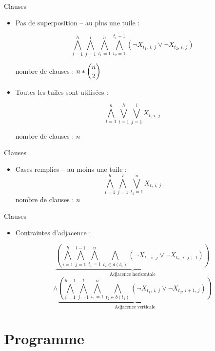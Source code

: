 \documentclass[aspectratio=43,11pt,hyperref={pdfpagemode=FullScreen}]{beamer}
\begin{document}
\begin{frame}{Clauses}
\begin{itemize}
\item Pas de superposition -- au plus une tuile :

$$ \bigwedge_{i = 1}^{h} \bigwedge_{j = 1}^{l} \bigwedge_{t_1 = 1}^{n} \bigwedge_{t_2 = 1}^{t_1-1} \left( \lnot X_{t_1, \, i, \, j} \lor \lnot X_{t_2, \, i, \, {j}} \right) $$

 nombre de clauses : $n*\dbinom{n}{2} $

\item Toutes les tuiles sont utilisées :

$$ \bigwedge_{t = 1}^{n} \bigvee_{i = 1}^{h} \bigvee_{j = 1}^{l}  X_{t, \, i, \, j} $$

 nombre de clauses : $n$ 
\end{itemize}

\end{frame}

\begin{frame}{Clauses}
    \begin{itemize}
         \item Cases remplies -- au moins une tuile :
        $$\bigwedge_{i = 1}^{h} \bigwedge_{j = 1}^{l} \bigvee_{t_1 = 1}^{n}  X_{t, \, i, \, j}$$
         nombre de clauses : $n$ 
   \end{itemize}
\end{frame}

\begin{frame}{Clauses}
    \begin{itemize}
        \item Contraintes d'adjacence :
        
        $$ \underbrace{\left( \bigwedge_{i = 1}^{h} \bigwedge_{j = 1}^{l - 1} \bigwedge_{t_1 = 1}^{n} \bigwedge_{t_2 \in d(t_1)} \left( \lnot X_{t_1, \, i, \, j} \lor \lnot X_{t_2, \, i, \, {j+1}} \right) \right)}_{\text{Adjacence horizontale}}$$
        $$\land \underbrace{\left( \bigwedge_{i = 1}^{h - 1} \bigwedge_{j = 1}^{l} \bigwedge_{t_1 = 1}^{n} \bigwedge_{t_2 \in b(t_1)} \left( \lnot X_{t_1, \, i, \, j} \lor \lnot X_{t_2, \, {i+1}, \, j} \right) \right)}_{\text{Adjacence verticale}} $$
    \end{itemize}
\end{frame}

\section{Programme}
\end{document}
